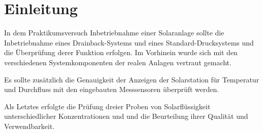 \section{Einleitung}

In dem Praktikumsversuch Inbetriebnahme einer Solaranlage sollte die Inbetriebnahme eines Drainback-Systems und eines Standard-Drucksystems und die Überprüfung derer Funktion erfolgen. Im Vorhinein wurde sich mit den verschiedenen Systemkomponenten der realen Anlagen vertraut gemacht.  

Es sollte zusätzlich die Genauigkeit der Anzeigen der Solarstation für Temperatur und Durchfluss mit den eingebauten Messsensoren überprüft werden. 

Als Letztes erfolgte die Prüfung dreier Proben von Solarflüssigkeit unterschiedlicher Konzentrationen und und die Beurteilung ihrer Qualität und Verwendbarkeit. 


